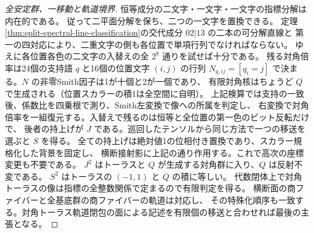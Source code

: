 \begin{proof}[全安定群、一移動と軌道境界]
恒等成分の二文字・一文字・一文字の指標分解は内在的である。
従って二平面分解を保ち、二つの一文字を置換できる。
定理\ref{thm:split-spectral-line-classification}の交代成分 $02|13$ の二本の可分解直線と
第一の四対応により、二重文字の側も各位置で単項行列でなければならない。
ゆえに各位置各色の二文字の入替えの全 $2^8$ 通りを試せば十分である。
残る対角倍率は24個の支持語 $q$ と16個の位置文字 $(i,j)$ の行列
$N_{q,ij}=[q_i=j]$ で決まる。$N$ の非零Smith因子は1が十個と2が一個であり、
有限対角核はちょうど $Q$ で生成される（位置スカラーの積1は全空間に自明）。
上記検算では支持の一致後、係数比を四乗根で測り、Smith左変換で像への所属を判定し、
右変換で対角倍率を一組復元する。入替えで残るのは恒等と全位置の第一色のビット反転だけで、
後者の持上げが $J$ である。巡回したテンソルから同じ方法で一つの移送を選ぶと $S$ を得る。
全ての持上げは絶対値1の位相付き置換であり、スカラー規格化した背景を固定し、
横断接射影に上記の通り作用する。これで高次の座標変更も不要である。
$J^2$ はトーラスと $Q$ が生成する対角群に入り、$Q$ は反射不変である。
$S^2$ はトーラスの $(-1,1)$ と $Q$ の積に等しい。
代数閉体上で対角トーラスの像は指標の全整数関係で定まるので有限判定を得る。
横断面の商ファイバーと全基底群の商ファイバーの軌道は対応し、
その特殊化順序も一致する。対角トーラス軌道閉包の面による記述を有限個の移送と合わせれば最後の主張となる。
\end{proof}
